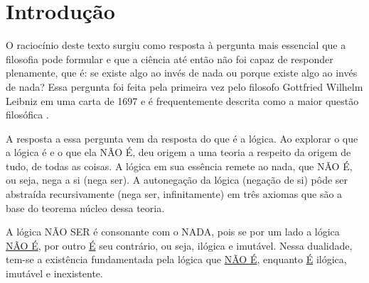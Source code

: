 \section*{Introdução}

O raciocínio deste texto surgiu como resposta à pergunta mais essencial que a filosofia pode formular e que a ciência até então não foi capaz de responder plenamente, que é: se existe algo ao invés de nada ou porque existe algo ao invés de nada? 
Essa pergunta foi feita pela primeira vez pelo filosofo Gottfried Wilhelm Leibniz em uma carta de 1697 e é frequentemente descrita como a maior questão filosófica \cite{ leibnizbrasil_origem_das_coisas}.

A resposta a essa pergunta vem da resposta do que é a lógica. Ao explorar o que a lógica é e o que ela NÃO É, deu origem a uma teoria a respeito da origem de tudo, de todas as coisas. A lógica em sua essência remete ao nada, que NÃO É, ou seja, nega a si (nega ser). A autonegação da lógica (negação de si) pôde ser abstraída recursivamente (nega ser, infinitamente) em três axiomas que são a base do teorema núcleo dessa teoria.

A lógica NÃO SER é consonante com o NADA, pois se por um lado a lógica \underline{NÃO É}, por outro \underline{É} seu contrário, ou seja, ilógica e imutável. Nessa dualidade, tem-se a existência fundamentada pela lógica que \underline{NÃO É}, enquanto \underline{É} ilógica, imutável e inexistente. 

